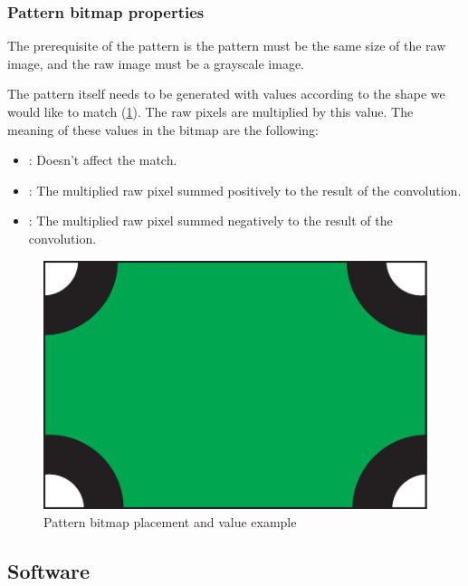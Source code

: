 \subsubsection{Pattern bitmap properties}

The prerequisite of the pattern is the pattern must be the same size of the raw image, and the raw image must be a grayscale image.

The pattern itself needs to be generated with values according to the shape we would like to match (\cref{fig:case_study:convoluter_image}). The raw pixels are multiplied by this value. The meaning of these values in the bitmap are the following: 
\begin{itemize}
	\item {}: Doesn't affect the match.
	\item {}: The multiplied raw pixel summed positively to the result of the convolution.
	\item {}: The multiplied raw pixel summed negatively to the result of the convolution.
\end{itemize}

\begin{figure}[h]
	\centering
	\includegraphics[valign=c,width=.5\linewidth]{include/figures/chapter_6/math_2}
	\caption{Pattern bitmap placement and value example}
	\label{fig:case_study:convoluter_image}
\end{figure}

\subsection{Software}

